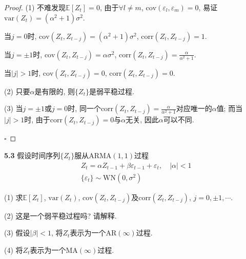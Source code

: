\documentclass[cn,12pt,math=mtpro2,citestyle=gb7714-2015,bibstyle=gb7714-2015,twocol,mode=simple]{elegantbook}
\newcommand{\E}{\mathbb{E}}
\newcommand{\var}{\text{var}}
\begin{document}
  \begin{proof}
    (1) 不难发现$\E[Z_t]=0$, 由于$\forall l\neq m$, $\text{cov}(\varepsilon_l,\varepsilon_m)=0$, 易证$\var(Z_t)=(\alpha^2+1)\sigma^2$.

     当$j=0$时, $\text{cov}(Z_t,Z_{t-j})=(\alpha^2+1)\sigma^2$, $\text{corr}(Z_t,Z_{t-j})=1$.

     当$j=\pm1$时, $\text{cov}(Z_t,Z_{t-j})=\alpha\sigma^2$, $\displaystyle \text{corr}(Z_t,Z_{t-j})=\frac{\alpha}{\alpha^2+1}$.

     当$|j|>1$时, $\text{cov}(Z_t,Z_{t-j})=0$, $\text{corr}(Z_t,Z_{t-j})=0$.

    (2) 只要$\alpha$是有限的, 则$\{Z_t\}$是弱平稳过程.

    (3) 当$j=\pm1$或$j=0$时, 同一个$\displaystyle \text{corr}(Z_t,Z_{t-j})=\frac{\alpha}{\alpha^2+1}$对应唯一的$\alpha$值; 而当$|j|>1$时, 由于$\text{corr}(Z_{t},Z_{t-j})=0$与$\alpha$无关, 因此$\alpha$可以不同.

    $\square$
  \end{proof}


\textbf{5.3} 假设时间序列$\{Z_t\}$服从$\text{ARMA}(1,1)$过程
      \begin{align*}
  &Z_t=\alpha Z_{t-1}+\beta\varepsilon_{t-1}+\varepsilon_t,\quad |\alpha|<1 \\
  &\{\varepsilon_t\}\sim \text{WN}(0,\sigma^2)
  \end{align*}

(1) 求$\E[Z_t]$, $\var(Z_t)$, $\text{cov}(Z_t,Z_{t-j})$及$\text{corr}(Z_t,Z_{t-j})$, $j=0, \pm 1, \cdots$.

(2) 这是一个弱平稳过程吗? 请解释.

(3) 假设$|\beta|<1$, 将$Z_t$表示为一个$\text{AR}(\infty)$过程.

(4) 将$Z_t$表示为一个$\text{MA}(\infty)$过程.
\end{document}
